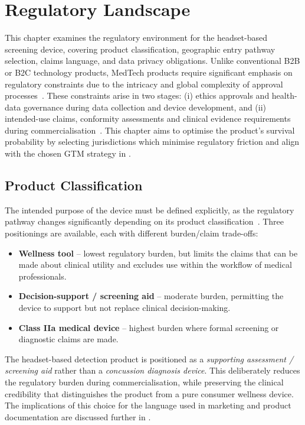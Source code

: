 \chapter{Regulatory Landscape}
\label{chapter:ent-regulatory}


This chapter examines the regulatory environment for the headset-based  screening device, covering product classification, geographic entry pathway selection, claims language, and data privacy obligations. Unlike conventional B2B or B2C technology products, MedTech products require significant emphasis on regulatory constraints due to the intricacy and global complexity of approval processes~\cite{frontiers2024medtechregulation}. These constraints arise in two stages: (i) ethics approvals and health-data governance during data collection and device development, and (ii) intended-use claims, conformity assessments and clinical evidence requirements during commercialisation~\cite{hra_medical_devices,gov_uk_software_apps}. This chapter aims to optimise the product's survival probability by selecting jurisdictions which minimise regulatory friction and align with the chosen GTM strategy in .


\section{Product Classification}
\label{sec:ent-classification}

The intended purpose of the device must be defined explicitly, as the regulatory pathway changes significantly depending on its product classification~\cite{gov_uk_samd}. Three positionings are available, each with different burden/claim trade-offs:
\begin{itemize}
    \item \textbf{Wellness tool} -- lowest regulatory burden, but limits the claims that can be made about clinical utility and excludes use within the workflow of medical professionals.
    \item \textbf{Decision-support / screening aid} -- moderate burden, permitting the device to support but not replace clinical decision-making.
    \item \textbf{Class IIa medical device} -- highest burden where formal screening or diagnostic claims are made.
\end{itemize}
The headset-based  detection product is positioned as a \emph{supporting assessment / screening aid} rather than a \emph{concussion diagnosis device}. This deliberately reduces the regulatory burden during commercialisation, while preserving the clinical credibility that distinguishes the product from a pure consumer wellness device. The implications of this choice for the language used in marketing and product documentation are discussed further in .


